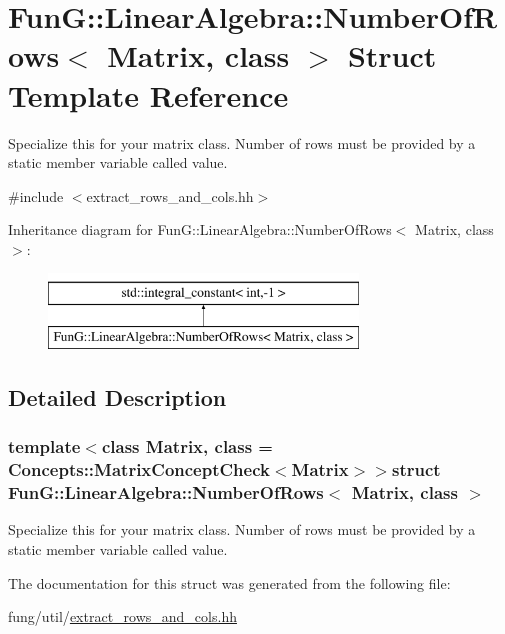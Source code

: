 \hypertarget{structFunG_1_1LinearAlgebra_1_1NumberOfRows}{}\section{Fun\+G\+:\+:Linear\+Algebra\+:\+:Number\+Of\+Rows$<$ Matrix, class $>$ Struct Template Reference}
\label{structFunG_1_1LinearAlgebra_1_1NumberOfRows}


Specialize this for your matrix class. Number of rows must be provided by a static member variable called value.  




{\ttfamily \#include $<$extract\+\_\+rows\+\_\+and\+\_\+cols.\+hh$>$}

Inheritance diagram for Fun\+G\+:\+:Linear\+Algebra\+:\+:Number\+Of\+Rows$<$ Matrix, class $>$\+:\begin{figure}[H]
\begin{center}
\leavevmode
\includegraphics[height=2.000000cm]{structFunG_1_1LinearAlgebra_1_1NumberOfRows}
\end{center}
\end{figure}


\subsection{Detailed Description}
\subsubsection*{template$<$class Matrix, class = Concepts\+::\+Matrix\+Concept\+Check$<$\+Matrix$>$$>$struct Fun\+G\+::\+Linear\+Algebra\+::\+Number\+Of\+Rows$<$ Matrix, class $>$}

Specialize this for your matrix class. Number of rows must be provided by a static member variable called value. 

The documentation for this struct was generated from the following file\+:\begin{DoxyCompactItemize}
\item 
fung/util/\hyperlink{extract__rows__and__cols_8hh}{extract\+\_\+rows\+\_\+and\+\_\+cols.\+hh}\end{DoxyCompactItemize}
